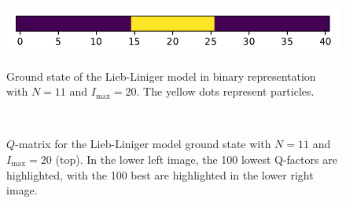 \documentclass[11pt, a4paper]{report} %
\begin{document}
\begin{figure}[tb!]
  \centering
  \includegraphics{state.pdf}
  \caption{Ground state of the Lieb-Liniger model in binary representation with \(N=11\) and \(I_{\max}=20\). The yellow dots represent particles.}\label{fig:binarygroundstate}
  \vspace*{\floatsep}
  \\
  \caption{\(Q\)-matrix for the Lieb-Liniger model ground state with \(N=11\) and \(I_{\max}=20\) (top). In the lower left image, the 100 lowest Q-factors are highlighted, with the 100 best are highlighted in the lower right image.}\label{fig:qmatrix}
\end{figure}
\end{document}
